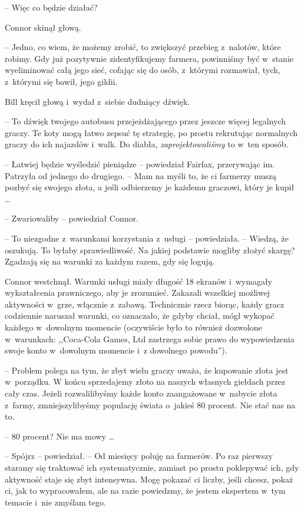 \documentclass[oneside,polish,11pt,rmheadings]{mwbk}
\begin{document}
-- Więc co będzie działać? 

Connor skinął głową. 

-- Jedno, co wiem, że możemy zrobić, to zwiększyć przebieg z~nalotów, które robimy. Gdy już pozytywnie zidentyfikujemy farmera, powinniśmy być w~stanie wyeliminować całą jego sieć, cofając się do osób, z~którymi rozmawiał, tych, z~którymi się bawił, jego gildii.

Bill kręcił głową i~wydał z~siebie dudniący dźwięk. 

-- To dźwięk twojego autobusu przejeżdżającego przez jeszcze więcej legalnych graczy. Te koty mogą łatwo zepsuć tę strategię, po prostu rekrutując normalnych graczy do ich najazdów i~walk. Do diabła, \textit{zaprojektowaliśmy }to w~ten sposób.

-- Łatwiej będzie wyśledzić pieniądze -- powiedział Fairfax, przerywając im. Patrzyła od jednego do drugiego. -- Mam na myśli to, że ci farmerzy muszą pozbyć się swojego złota, a jeśli odbierzemy je każdemu graczowi, który je kupił \ldots 

-- Zwariowaliby -- powiedział Connor.

-- To niezgodne z~warunkami korzystania z~usługi -- powiedziała. -- Wiedzą, że oszukują. To byłaby sprawiedliwość. Na jakiej podstawie mogliby złożyć skargę? Zgadzają się na warunki za każdym razem, gdy się logują.

Connor westchnął. Warunki usługi miały długość 18 ekranów i~wymagały wykształcenia prawniczego, aby je zrozumieć. Zakazali wszelkiej możliwej aktywności w~grze, włącznie z~zabawą. Technicznie rzecz biorąc, każdy gracz codziennie naruszał warunki, co oznaczało, że gdyby chciał, mógł wykopać każdego w~dowolnym momencie (oczywiście było to również dozwolone w~warunkach: ,,Coca-Cola Games, Ltd zastrzega sobie prawo do wypowiedzenia swoje konto w~dowolnym momencie i~z dowolnego powodu''). 

-- Problem polega na tym, że zbyt wielu graczy uważa, że kupowanie złota jest w~porządku. W końcu sprzedajemy złoto na naszych własnych giełdach przez cały czas. Jeżeli rozwalilibyśmy każde konto zaangażowane w~nabycie złota z~farmy, zmniejszylibyśmy populację świata o~jakieś 80 procent. Nie stać nas na to.

-- 80 procent? Nie ma mowy \ldots  

-- Spójrz -- powiedział. -- Od miesięcy poluję na farmerów. Po raz pierwszy staramy się traktować ich systematycznie, zamiast po prostu poklepywać ich, gdy aktywność staje się zbyt intensywna. Mogę pokazać ci liczby, jeśli chcesz, pokaż ci, jak to wypracowałem, ale na razie powiedzmy, że jestem ekspertem w~tym temacie i~nie zmyślam tego.
\end{document}

